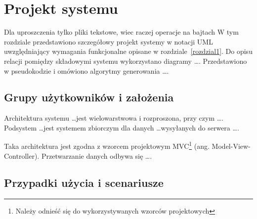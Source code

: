 \chapter{Projekt systemu}
\thispagestyle{chapterBeginStyle}
Dla uproszczenia tylko pliki tekstowe, wiec raczej operacje na bajtach
{\color{dgray}
W tym rozdziale przedstawiono szczegółowy projekt systemy w notacji UML uwzględniający wymagania funkcjonalne opisane w rozdziale~\ref{rozdzial1}. Do opisu relacji pomiędzy składowymi systemu wykorzystano diagramy \ldots.
Przedstawiono w pseudokodzie i omówiono algorytmy generowania \ldots.
}


\section{Grupy użytkowników i założenia}

{\color{dgray}
Architektura systemu \ldots jest wielowarstwowa i rozproszona, przy czym \ldots. Podsystem  \ldots jest systemem zbiorczym dla danych \ldots wysyłanych do serwera \ldots. 

Taka architektura jest zgodna z wzorcem projektowym MVC\footnote{Należy odnieść się do wykorzystywanych wzorców projektowych} (ang.  Model-View-Controller). Przetwarzanie danych odbywa się \ldots.
} 

\section{Przypadki użycia i scenariusze}

